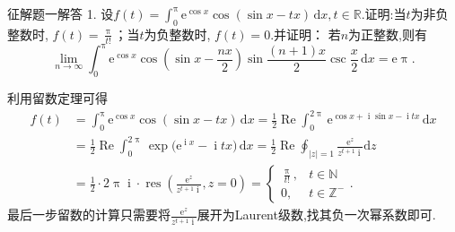 \documentclass[UTF8,no-math,12pt,openany,table,dvipsnames,svgnames]{book}
\renewcommand{\pi}{\uppi}
\newcommand{\hei}{\CJKfamily{hei}}
\newenvironment{solve}{\par\indent{\hei 解}\hspace{1em}}{\par}
\newcommand{\ii}{\;\!\mathrm i\;\!}
\begin{document}
\begin{MYBOX}[colbacktitle=green]{征解题一解答}
1. 设$f(t)=\int_0^\pi\mathrm e^{\cos x}\cos(\sin x-tx)\,\mathrm dx,t\in\mathbb R$.证明:当$t$为非负整数时, $f(t)=\frac{\pi}{t!}$；当$t$为负整数时, $f(t)=0$.并证明： 若$n$为正整数,则有
\[\lim_{n\to\infty}\int_0^\pi\mathrm e^{\cos x}\cos\left(\sin x-\frac{nx}2\right)\sin\frac{(n+1)x}2\csc\frac x2\,\mathrm dx=\mathrm e\pi.\]
\tcblower
\begin{solve}
利用留数定理可得
\begin{align*}
f(t)&=\int_0^\pi\mathrm e^{\cos x}\cos(\sin x-tx)\,\mathrm dx=\frac12\operatorname{Re}\int_0^{2\pi}\mathrm e^{\cos x+\ii\sin x-\ii tx}\,\mathrm dx\\
&=\frac12\operatorname{Re}\int_0^{2\pi}\mathrm \exp\bigl(\mathrm e^{\ii x}-\ii tx\bigr)\,\mathrm dx
=\frac12\operatorname{Re}\oint_{|z|=1}\frac{\mathrm e^z}{z^{t+1}\ii}\mathrm dz\\
&=\frac12\cdot2\pi\ii\cdot\operatorname{res}\left(\frac{\mathrm e^z}{z^{t+1}\ii},z=0\right)
=\begin{cases}
\frac{\pi}{t!},&t\in\mathbb N\\
0,&t\in\mathbb Z^{-}
\end{cases}.
\end{align*}
最后一步留数的计算只需要将$\frac{\mathrm e^z}{z^{t+1}\ii}$展开为Laurent级数,找其负一次幂系数即可.


\end{solve}
\end{MYBOX}
\end{document}
